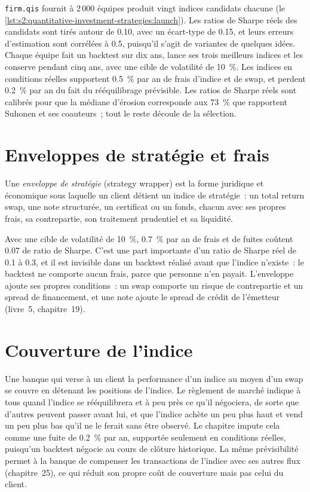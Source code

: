 \texttt{firm.qis} fournit à 2\,000 équipes produit vingt indices candidats chacune (le \cref{lst:s2:quantitative-investment-strategies:launch}). Les ratios de Sharpe réels des
candidats sont tirés autour de 0.10, avec un écart-type de 0.15, et leurs erreurs d'estimation sont corrélées à 0.5, puisqu'il s'agit de variantes
de quelques idées. Chaque équipe fait un backtest sur dix ans, lance ses trois meilleurs indices et les conserve pendant cinq ans, avec une cible de volatilité de 10~\%. Les
indices en conditions réelles supportent 0.5~\% par an de frais d'indice et de swap, et perdent 0.2~\% par an du fait du rééquilibrage prévisible. Les ratios de Sharpe réels sont calibrés pour que la
médiane d'érosion corresponde aux 73~\% que rapportent Suhonen et ses coauteurs~; tout le reste découle de la sélection.

\section{Enveloppes de stratégie et frais}

\begin{definition}\label{def:s2:quantitative-investment-strategies:wrapper}
Une \emph{enveloppe de stratégie} (strategy wrapper) est la forme juridique et économique sous laquelle un client détient un indice de stratégie~: un total return swap,
une note structurée, un certificat ou un fonds, chacun avec ses propres frais, sa contrepartie, son traitement prudentiel et sa liquidité.
\end{definition}

Avec une cible de volatilité de 10~\%, 0.7~\% par an de frais et de fuites coûtent 0.07 de ratio de Sharpe. C'est une part importante d'un ratio de Sharpe réel de 0.1 à 0.3,
et il est invisible dans un backtest réalisé avant que l'indice n'existe~: le backtest ne comporte aucun frais, parce que personne n'en payait. L'enveloppe ajoute ses propres conditions~:
un swap comporte un risque de contrepartie et un spread de financement, et une note ajoute le spread de crédit de l'émetteur (livre~5, chapitre~19).

\section{Couverture de l'indice}

Une banque qui verse à un client la performance d'un indice au moyen d'un swap se couvre en détenant les positions de l'indice. Le règlement de marché indique à tous quand l'indice
se rééquilibrera et à peu près ce qu'il négociera, de sorte que d'autres peuvent passer avant lui, et que l'indice achète un peu plus haut et vend un peu plus bas qu'il ne le ferait
sans être observé. Le chapitre impute cela comme une fuite de 0.2~\% par an, supportée seulement en conditions réelles, puisqu'un backtest négocie au cours de clôture historique. La même
prévisibilité permet à la banque de compenser les transactions de l'indice avec ses autres flux (chapitre~25), ce qui réduit son propre coût de couverture mais pas celui du client.

